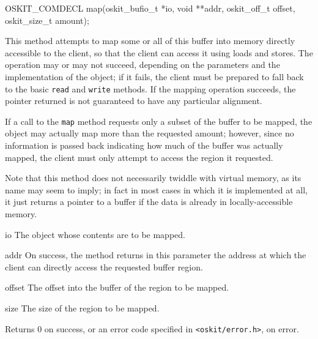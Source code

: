 \begin{apisyn}

	\funcproto OSKIT_COMDECL
	map(oskit_bufio_t *io, \outparam void **addr,
	    oskit_off_t offset, oskit_size_t amount);
\end{apisyn}
\begin{apidesc}
	This method attempts to map some or all of this buffer
	into memory directly accessible to the client,
	so that the client can access it using
	loads and stores.
	The operation may or may not succeed,
	depending on the parameters and the implementation of the object;
	if it fails, the client must be prepared
	to fall back to the basic \texttt{read} and \texttt{write} methods.
	If the mapping operation succeeds,
	the pointer returned is not guaranteed to have any particular alignment.

	If a call to the \texttt{map} method
	requests only a subset of the buffer to be mapped,
	the object may actually map more than the requested amount;
	however, since no information is passed back
	indicating how much of the buffer was actually mapped,
	the client must only attempt to access the region it requested.

	Note that this method does not necessarily twiddle with virtual memory,
	as its name may seem to imply;
	in fact in most cases in which it is implemented at all,
	it just returns a pointer to a buffer
	if the data is already in locally-accessible memory.
\end{apidesc}
\begin{apiparm}
	\item[io]
		The object whose contents are to be mapped.
	\item[addr]
		On success,
		the method returns in this parameter
		the address at which the client
		can directly access the requested buffer region.
	\item[offset]
		The offset into the buffer of the region to be mapped.
	\item[size]
		The size of the region to be mapped.
\end{apiparm}
\begin{apiret}
	Returns 0 on success, or an error code specified in
	{\tt <oskit/error.h>}, on error.
\end{apiret}

